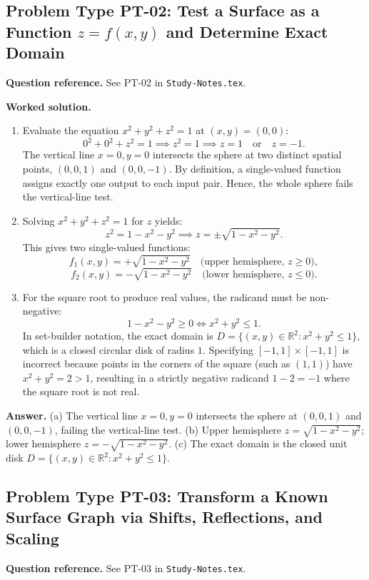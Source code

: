 \documentclass[11pt,letterpaper]{article}
\newcommand{\R}{\mathbb{R}}
\begin{document}
\subsection{Problem Type PT-02: Test a Surface as a Function $z=f(x,y)$ and Determine Exact Domain}
\textbf{Question reference.} See PT-02 in \texttt{Study-Notes.tex}.

\textbf{Worked solution.}
\begin{enumerate}[label=(\alph*),leftmargin=*]
    \item Evaluate the equation $x^2 + y^2 + z^2 = 1$ at $(x,y) = (0,0)$:
    \[ 0^2 + 0^2 + z^2 = 1 \implies z^2 = 1 \implies z = 1 \quad \text{or} \quad z = -1. \]
    The vertical line $x=0, y=0$ intersects the sphere at two distinct spatial points, $(0,0,1)$ and $(0,0,-1)$. By definition, a single-valued function assigns exactly one output to each input pair. Hence, the whole sphere fails the vertical-line test.
    \item Solving $x^2 + y^2 + z^2 = 1$ for $z$ yields:
    \[ z^2 = 1 - x^2 - y^2 \implies z = \pm\sqrt{1 - x^2 - y^2}. \]
    This gives two single-valued functions:
    \[ f_1(x,y) = +\sqrt{1 - x^2 - y^2} \quad \text{(upper hemisphere, } z \ge 0\text{)}, \]
    \[ f_2(x,y) = -\sqrt{1 - x^2 - y^2} \quad \text{(lower hemisphere, } z \le 0\text{)}. \]
    \item For the square root to produce real values, the radicand must be non-negative:
    \[ 1 - x^2 - y^2 \ge 0 \iff x^2 + y^2 \le 1. \]
    In set-builder notation, the exact domain is $D = \{(x,y) \in \R^2 : x^2 + y^2 \le 1\}$, which is a closed circular disk of radius $1$. Specifying $[-1,1] \times [-1,1]$ is incorrect because points in the corners of the square (such as $(1,1)$) have $x^2 + y^2 = 2 > 1$, resulting in a strictly negative radicand $1 - 2 = -1$ where the square root is not real.
\end{enumerate}

\textbf{Answer.}
(a) The vertical line $x=0, y=0$ intersects the sphere at $(0,0,1)$ and $(0,0,-1)$, failing the vertical-line test.
(b) Upper hemisphere $z = \sqrt{1 - x^2 - y^2}$; lower hemisphere $z = -\sqrt{1 - x^2 - y^2}$.
(c) The exact domain is the closed unit disk $D = \{(x,y) \in \R^2 : x^2 + y^2 \le 1\}$.

\subsection{Problem Type PT-03: Transform a Known Surface Graph via Shifts, Reflections, and Scaling}
\textbf{Question reference.} See PT-03 in \texttt{Study-Notes.tex}.
\end{document}
